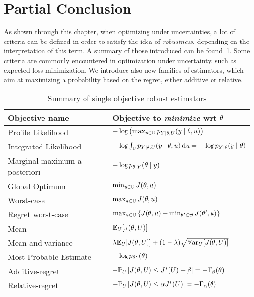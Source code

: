 \documentclass[../../Main_ManuscritThese.tex]{subfiles}
\begin{document}
\section{Partial Conclusion}
\label{sec:ch3_partial_ccl}
As shown through this chapter, when optimizing under uncertainties, a lot of criteria can be defined in order to satisfy the idea of \emph{robustness}, depending on the interpretation of this term. A summary of those introduced can be found~\cref{tab:summary_robust}. Some criteria are commonly encountered in optimization under uncertainty, such as expected loss minimization. We introduce also new families of estimators, which aim at maximizing a probability based on the regret, either additive or relative.
\begin{table}[ht]
  \centering
  \begin{tabular}{ll}
    \toprule
    Objective name & Objective to \emph{minimize} wrt $\theta$  \\ \midrule
    Profile Likelihood & $-\log \left(\max_{u \in \mathbb{U}} p_{Y \mid \theta, U}(y \mid \theta, u)\right)$  \\
    Integrated Likelihood & $-\log \int_{\mathbb{U}} p_{Y \mid \theta, U}(y \mid \theta, u) \,\mathrm{d}u=-\log p_{Y\mid \theta}(y\mid \theta)$ \\
    Marginal maximum a posteriori & $-\log p_{\theta\mid Y}(\theta \mid y)$  \\ \midrule
    Global Optimum & $\min_{u\in\mathbb{U}} J(\theta, u)$ \\
    Worst-case & $\max_{u \in \mathbb{U}} J(\theta, u)$ \\
    Regret worst-case & $\max_{u\in\mathbb{U}}\left\{J(\theta, u) - \min_{\theta^{\prime}\in\Theta} J(\theta^{\prime}, u)\right\}$ \\ \midrule
    Mean & $\mathbb{E}_{U}[J(\theta, U)]$  \\
    Mean and variance & $ \lambda \mathbb{E}_{U}[J(\theta, U)] + (1-\lambda) \sqrt{\mathbb{V}\mathrm{ar}_{U}[J(\theta, U)]}$  \\ \midrule
    Most Probable Estimate & $-\log p_{\theta^*}(\theta)$ \\
    Additive-regret & $-\mathbb{P}_{U}\left[J(\theta, U) \leq J^*(U) + \beta \right]=-\Gamma_{\beta}(\theta)$ \\
    Relative-regret & $-\mathbb{P}_{U}\left[J(\theta, U) \leq \alpha J^*(U) \right]=-\Gamma_{\alpha}(\theta) $ \\ \bottomrule
  \end{tabular}
  \caption{\label{tab:summary_robust}Summary of single objective robust estimators}
\end{table}
 
\end{document}
